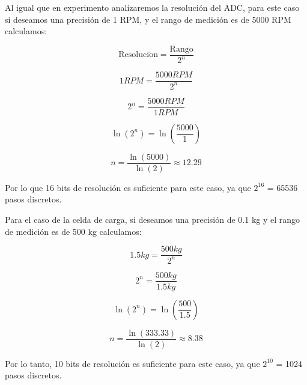 Al igual que en experimento analizaremos la resolución del ADC, para este caso si deseamos una precisión de 1 RPM, y el rango de medición es de 5000 RPM calculamos:

\begin{equation*}
	\mathrm{Resoluci\acute{o}n} = \frac{\mathrm{Rango}}{2^{n}}
\end{equation*}

\begin{equation*}
	1RPM = \frac{5000RPM}{2^{n}}
\end{equation*}

\begin{equation*}
	2^{n} = \frac{5000RPM}{1RPM}
\end{equation*}

\begin{equation*}
	\ln(2^{n}) = \ln(\frac{5000}{1})
\end{equation*}

\begin{equation*}
	n = \frac{\ln(5000)}{\ln(2)} \approx 12.29
\end{equation*}

Por lo que 16 bits de resolución es suficiente para este caso, ya que $2^{16}$ = 65536 pasos discretos.

Para el caso de la celda de carga, si deseamos una precisión de 0.1 kg y el rango de medición es de 500 kg calculamos:

\begin{equation*}
	1.5kg = \frac{500kg}{2^{n}}
\end{equation*}

\begin{equation*}
	2^{n} = \frac{500kg}{1.5kg}
\end{equation*}

\begin{equation*}
	\ln(2^{n}) = \ln(\frac{500}{1.5})
\end{equation*}

\begin{equation*}
	n = \frac{\ln(333.33)}{\ln(2)} \approx 8.38
\end{equation*}

Por lo tanto, 10 bits de resolución es suficiente para este caso, ya que $2^{10}$ = 1024 pasos discretos.
